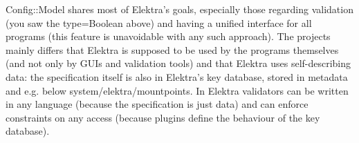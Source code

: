 Config\+::\+Model shares most of Elektra’s goals, especially those regarding validation (you saw the type=Boolean above) and having a unified interface for all programs (this feature is unavoidable with any such approach). The projects mainly differs that Elektra is supposed to be used by the programs themselves (and not only by G\+U\+Is and validation tools) and that Elektra uses self-\/describing data\+: the specification itself is also in Elektra’s key database, stored in metadata and e.\+g. below system/elektra/mountpoints. In Elektra validators can be written in any language (because the specification is just data) and can enforce constraints on any access (because plugins define the behaviour of the key database). 